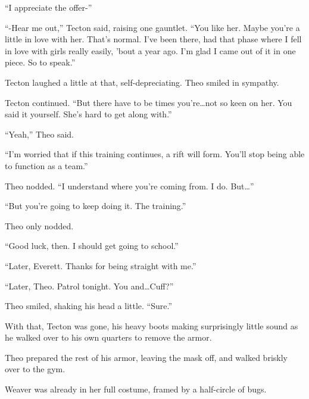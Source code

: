 ``I appreciate the offer-''



``-Hear me out,'' Tecton said, raising one gauntlet.  ``You like her.  Maybe you're a little in love with her.  That's normal.  I've been there, had that phase where I fell in love with girls really easily, 'bout a year ago.  I'm glad I came out of it in one piece.  So to speak.''



Tecton laughed a little at that, self-depreciating.  Theo smiled in sympathy.



Tecton continued.  ``But there have to be times you're\ldots not so keen on her.  You said it yourself.  She's hard to get along with.''



``Yeah,'' Theo said.



``I'm worried that if this training continues, a rift will form.  You'll stop being able to function as a team.''



Theo nodded.  ``I understand where you're coming from.  I do.  But\ldots''



``But you're going to keep doing it.  The training.''



Theo only nodded.



``Good luck, then.  I should get going to school.''



``Later, Everett.  Thanks for being straight with me.''



``Later, Theo.  Patrol tonight.  You and\ldots Cuff?''



Theo smiled, shaking his head a little.  ``Sure.''



With that, Tecton was gone, his heavy boots making surprisingly little sound as he walked over to his own quarters to remove the armor.



Theo prepared the rest of his armor, leaving the mask off, and walked briskly over to the gym.



Weaver was already in her full costume, framed by a half-circle of bugs.



